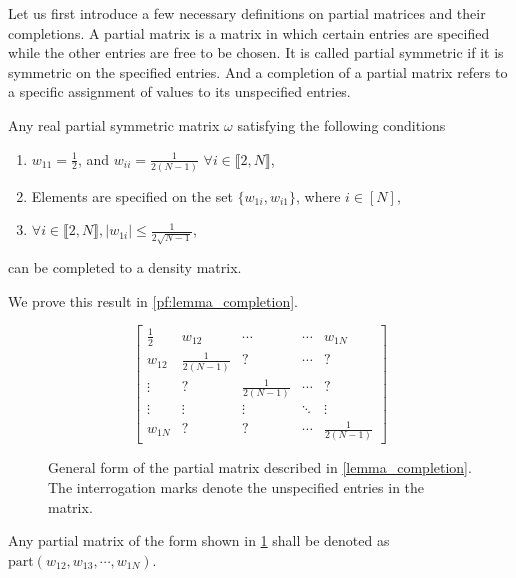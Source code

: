 Let us first introduce a few necessary definitions on partial matrices and their completions. A partial matrix is a matrix in which certain entries are specified while the other entries are free to be chosen. It is called partial symmetric if it is symmetric on the specified entries. And a completion of a partial matrix refers to a specific assignment of values to its unspecified entries. 



\begin{theorem}\label{lemma_completion}
    Any real partial symmetric matrix $\omega$ satisfying the following conditions
    \begin{enumerate}
        \item $w_{11}=\frac{1}{2}$, and $w_{ii}=\frac{1}{2(N-1)}$ $\forall i\in\llbracket2,N\rrbracket$,
        \item Elements are specified on the set $\{w_{1i}, w_{i1}\}$, where $i\in [N]$,
        \item $\forall i\in\llbracket2,N\rrbracket,|w_{1i}|\leq\frac1{2\sqrt{N-1}}$,
    \end{enumerate}
can be completed to a density matrix.
\end{theorem}
We prove this result in \cref{pf:lemma_completion}.
\begin{figure}[h]
    \centering
\[
\begin{bmatrix}
\frac12 & w_{12} & \cdots & \cdots & w_{1N} \\
w_{12} & \frac1{2(N-1)} & ? & \cdots & ? \\
\vdots & ? & \frac1{2(N-1)} & \cdots & ? \\
\vdots & \vdots & \vdots & \ddots & \vdots \\
w_{1N} & ? & ? & \cdots & \frac1{2(N-1)}
\end{bmatrix}
\]
\caption{General form of the partial matrix described in \cref{lemma_completion}. The interrogation marks denote the unspecified entries in the matrix.}
    \label{fig:part_matrix}
\end{figure}
Any partial matrix of the form shown in \cref{fig:part_matrix} shall be denoted as $\text{part} (w_{12}, w_{13}, \cdots, w_{1N})$.

